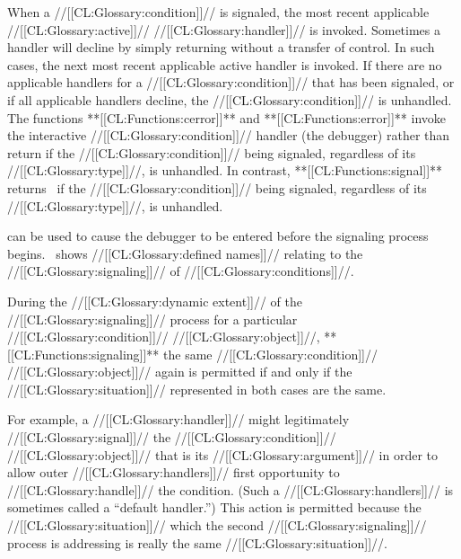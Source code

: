    
  When a //[[CL:Glossary:condition]]// is signaled, the most recent applicable //[[CL:Glossary:active]]// //[[CL:Glossary:handler]]// is invoked.   Sometimes a handler will decline by simply returning without a transfer of control. In such cases, the next most recent applicable active handler is invoked. 
  If there are no applicable handlers for a //[[CL:Glossary:condition]]// that has been signaled, or if all applicable handlers decline, the //[[CL:Glossary:condition]]// is unhandled.
  The functions **[[CL:Functions:cerror]]** and **[[CL:Functions:error]]** invoke the interactive //[[CL:Glossary:condition]]// handler (the debugger) rather than return if the //[[CL:Glossary:condition]]// being signaled, regardless of its //[[CL:Glossary:type]]//, is unhandled.  In contrast, **[[CL:Functions:signal]]** returns \nil\ if the //[[CL:Glossary:condition]]// being signaled, regardless of its //[[CL:Glossary:type]]//, is unhandled.

 can be used to cause the debugger to be entered before the signaling process begins.
  \Thenextfigure\ shows //[[CL:Glossary:defined names]]// relating to the //[[CL:Glossary:signaling]]// of //[[CL:Glossary:conditions]]//.



 During the //[[CL:Glossary:dynamic extent]]// of the //[[CL:Glossary:signaling]]// process for a particular //[[CL:Glossary:condition]]// //[[CL:Glossary:object]]//,  **[[CL:Functions:signaling]]** the same //[[CL:Glossary:condition]]// //[[CL:Glossary:object]]// again is permitted if and only if the //[[CL:Glossary:situation]]// represented in both cases are the same.

For example, a //[[CL:Glossary:handler]]// might legitimately //[[CL:Glossary:signal]]//  the //[[CL:Glossary:condition]]// //[[CL:Glossary:object]]// that is its //[[CL:Glossary:argument]]// in order to allow outer //[[CL:Glossary:handlers]]// first opportunity to //[[CL:Glossary:handle]]//  the condition.  (Such a //[[CL:Glossary:handlers]]// is sometimes called a ``default handler.'') This action is permitted because the //[[CL:Glossary:situation]]// which the second //[[CL:Glossary:signaling]]// process is addressing is really the same //[[CL:Glossary:situation]]//.

